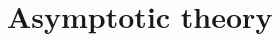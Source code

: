 \documentclass[12pt]{article}
\def\argmin{\mathop{\rm argmin}}
\def\bX{\mathop{\bf X}}
\newcommand{\OOO}{\boldsymbol \Omega}
\newcommand{\BB}{\mathbf B}
\newcommand{\R}{\mathbb R}
\newcommand{\1}{\uppercase\expandafter{\romannumeral1}}
\newcommand{\2}{\uppercase\expandafter{\romannumeral2}}
\newcommand{\0}{\textbf{0}}
\begin{document}
\begin{comment}
Details of the learning algorithm is summarized in Algorithm \ref{alg:1}.
\begin{singlespace}
	\begin{algorithm}[!htb]
		\caption{}
		\label{alg:1}
		
		\begin{algorithmic}[1]
			\STATE \textbf{Input: } Data matrix $\bX \in {\R}^{n \times p}$.
			\STATE Compute $\widehat{\OOO}$ by solving optimization problem (\ref{eq:opti1});
			\STATE Read off chain components $\{\widehat{\tau}_1,...,\widehat{\tau}_{\widehat{m}}\}$ from $\widehat{\OOO}$;
			\STATE Set $\widehat{I}=\emptyset$ and $\widehat{\cal C}=\emptyset$;
			\STATE  {\bf For} $k \in \{1,...,\widehat{m} \}$ {\bf do}:
			\begin{itemize}
				\item[a.]  $\widehat{\pi}_k = \argmin_{i \in \{1,..,\widehat{m}\}\backslash \widehat{I}} {\cal D} (\widehat{\tau}_i, \widehat{\cal C})$;
				\item[b.]  $\widehat{I}=\widehat{I} \cup \widehat{\pi}_k$ and $\widehat{\cal C} = \widehat{\cal C} \cup \widehat{\tau}_{\widehat{\pi}_k}$.
			\end{itemize}
			\STATE Obtain $\widehat{\BB}$ via multivariate regressions, sparse  SVD and element-wise thresholding as stated above.
			\STATE	{\bf Output:} $\widehat{\boldsymbol\pi}$ and  ($\widehat{\OOO}, \widehat{\BB}$).
		\end{algorithmic}
	\end{algorithm}
\end{singlespace}
\end{comment}


\section{Asymptotic theory}\label{sec:theory}
\end{document}

